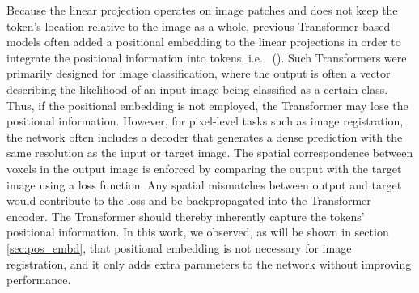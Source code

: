 \documentclass[times,twocolumn,final]{elsarticle}
\begin{document}
Because the linear projection operates on image patches and does not keep the token's location relative to the image as a whole, previous Transformer-based models often added a positional embedding to the linear projections in order to integrate the positional information into tokens, i.e. ~(\cite{vaswani2017attention, dosovitskiy2020image, liu2021swin, dong2021cswin}). Such Transformers were primarily designed for image classification, where the output is often a vector describing the likelihood of an input image being classified as a certain class. Thus, if the positional embedding is not employed, the Transformer may lose the positional information. However, for pixel-level tasks such as image registration, the network often includes a decoder that generates a dense prediction with the same resolution as the input or target image. The spatial correspondence between voxels in the output image is enforced by comparing the output with the target image using a loss function. Any spatial mismatches between output and target would contribute to the loss and be backpropagated into the Transformer encoder. The Transformer should thereby inherently capture the tokens' positional information. In this work, we observed, as will be shown in section \ref{sec:pos_embd}, that positional embedding is not necessary for image registration, and it only adds extra parameters to the network without improving performance.
\end{document}
